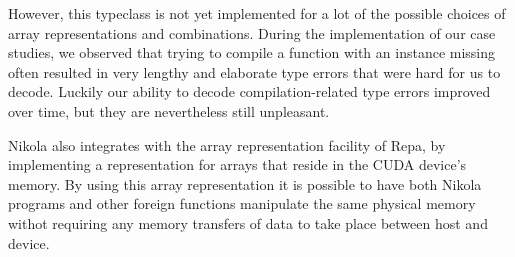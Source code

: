 However, this typeclass is not yet implemented for a lot of the
possible choices of array representations and combinations. During the
implementation of our case studies, we observed that trying to compile
a function with an instance missing often resulted in very lengthy and
elaborate type errors that were hard for us to decode. Luckily our
ability to decode compilation-related type errors improved over time,
but they are nevertheless still unpleasant.

Nikola also integrates with the array representation facility of Repa, by
implementing a representation for arrays that reside in the CUDA device's
memory. By using this array representation it is possible to have both Nikola
programs and other foreign functions manipulate the same physical memory withot
requiring any memory transfers of data to take place between host and device.

